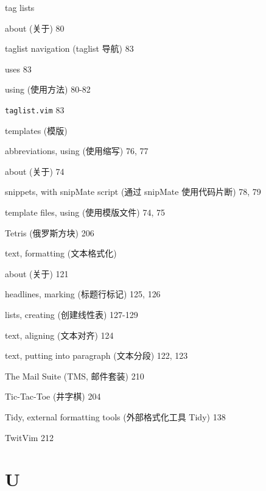\begin{multicols}{2}
\hangindent=3pc  tag lists \par
\hangindent=3pc \quad about (关于) 80 \par
\hangindent=3pc \quad taglist navigation (taglist 导航) 83 \par
\hangindent=3pc \quad uses 83 \par
\hangindent=3pc \quad using (使用方法) 80-82 \par

\hangindent=3pc  \texttt{taglist.vim} 83

\hangindent=3pc  templates (模版) \par
\hangindent=3pc \quad abbreviations, using (使用缩写) 76, 77 \par
\hangindent=3pc \quad about (关于) 74 \par
\hangindent=3pc \quad snippets, with snipMate script (通过 snipMate 使用代码片断) 78, 79 \par
\hangindent=3pc \quad template files, using (使用模版文件) 74, 75 \par

\hangindent=3pc  Tetris (俄罗斯方块) 206

\hangindent=3pc  text, formatting (文本格式化) \par
\hangindent=3pc \quad about (关于) 121 \par
\hangindent=3pc \quad headlines, marking (标题行标记) 125, 126 \par
\hangindent=3pc \quad lists, creating (创建线性表) 127-129 \par
\hangindent=3pc \quad text, aligning (文本对齐) 124 \par
\hangindent=3pc \quad text, putting into paragraph (文本分段) 122, 123 \par

\hangindent=3pc  The Mail Suite (TMS, 邮件套装) 210

\hangindent=3pc  Tic-Tac-Toe (井字棋) 204

\hangindent=3pc  Tidy, external formatting tools (外部格式化工具 Tidy) 138

\hangindent=3pc  TwitVim 212

\hangindent=3pc  \section*{U}


\end{multicols}

